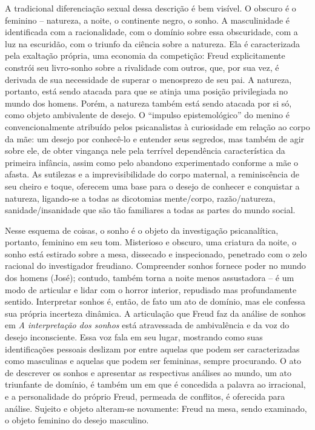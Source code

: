 A tradicional diferenciação sexual dessa descrição é bem visível. O
obscuro é o feminino -- natureza, a noite, o continente negro, o sonho.
A masculinidade é identificada com a racionalidade, com o domínio sobre
essa obscuridade, com a luz na escuridão, com o triunfo da ciência sobre
a natureza. Ela é caracterizada pela exaltação própria, uma economia da
competição: Freud explicitamente constrói seu livro-sonho sobre a
rivalidade com outros, que, por sua vez, é derivada de sua necessidade
de superar o menosprezo de seu pai. A natureza, portanto, está sendo
atacada para que se atinja uma posição privilegiada no mundo dos homens.
Porém, a natureza também está sendo atacada por si só, como objeto
ambivalente de desejo. O ``impulso epistemológico'' do menino é
convencionalmente atribuído pelos psicanalistas à curiosidade em relação
ao corpo da mãe: um desejo por conhecê-lo e entender seus segredos, mas
também de agir sobre ele, de obter vingança nele pela terrível
dependência característica da primeira infância, assim como pelo
abandono experimentado conforme a mãe o afasta. As sutilezas e a
imprevisibilidade do corpo maternal, a reminiscência de seu cheiro e
toque, oferecem uma base para o desejo de conhecer e conquistar a
natureza, ligando-se a todas as dicotomias mente/corpo, razão/natureza,
sanidade/insanidade que são tão familiares a todas as partes do mundo
social.

Nesse esquema de coisas, o sonho é o objeto da investigação
psicanalítica, portanto, feminino em seu tom. Misterioso e obscuro, uma
criatura da noite, o sonho está estirado sobre a mesa, dissecado e
inspecionado, penetrado com o zelo racional do investigador freudiano.
Compreender sonhos fornece poder no mundo dos homens (José); contudo,
também torna a noite menos assustadora -- é um modo de articular e lidar
com o horror interior, repudiado mas profundamente sentido. Interpretar
sonhos é, então, de fato um ato de domínio, mas ele confessa sua própria
incerteza dinâmica. A articulação que Freud faz da análise de sonhos em
\emph{A interpretação dos sonhos} está atravessada de ambivalência e da
voz do desejo inconsciente. Essa voz fala em seu lugar, mostrando como
suas identificações pessoais deslizam por entre aquelas que podem ser
caracterizadas como masculinas e aquelas que podem ser femininas, sempre
procurando. O ato de descrever os sonhos e apresentar as respectivas
análises ao mundo, um ato triunfante de domínio, é também um em que é
concedida a palavra ao irracional, e a personalidade do próprio Freud,
permeada de conflitos, é oferecida para análise. Sujeito e objeto
alteram-se novamente: Freud na mesa, sendo examinado, o objeto feminino
do desejo masculino.

